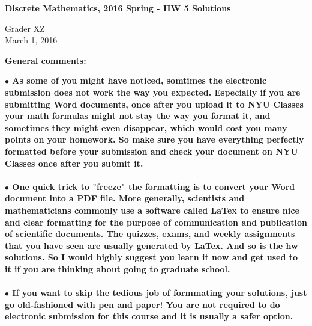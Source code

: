 \documentclass[11pt]{article}
\begin{document}
\vspace{-1in}

\begin{center}
{\bf Discrete Mathematics, 2016 Spring - HW 5 Solutions} 
\end{center}

\begin{center}
Grader XZ\\
March 1, 2016\\
\end{center}
\vspace{0.1in}
\begin{center}  {\bf General comments:\\}
\end{center}  
{\bf
$\bullet$ As some of you might have noticed, somtimes the electronic submission does not work the way you expected. Especially if you are submitting Word documents, once after you upload it to NYU Classes your math formulas might not stay the way you format it, and sometimes they might even disappear, which would cost you many points on your homework. So make sure you have everything perfectly formatted before your submission and check your document on NYU Classes once after you submit it. \\
\\
$\bullet$ One quick trick to "freeze" the formatting is to convert your Word document into a PDF file. More generally, scientists and mathematicians commonly use a software called LaTex to ensure nice and clear formatting for the purpose of communication and publication of scientific documents. The quizzes, exams, and weekly assignments that you have seen are usually generated by LaTex. And so is the hw solutions. So I would highly suggest you learn it now and get used to it if you are thinking about going to graduate school.\\
\\
$\bullet$ If you want to skip the tedious job of formmating your solutions, just go old-fashioned with pen and paper! You are not required to do electronic submission for this course and it is usually a safer option. \\
}
\end{document}
